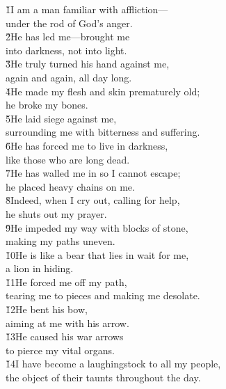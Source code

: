 \begin{poetry}
\poeml {}
\v{1}I am a man familiar with affliction--- \\
\poemll    under the rod of God's anger. \\
\poeml \v{2}He has led me---brought me \\
\poemll    into darkness, not into light. \\
\poeml \v{3}He truly turned his hand against me, \\
\poemll    again and again, all day long. \\
\poeml \v{4}He made my flesh and skin prematurely old; \\
\poemll    he broke my bones. \\
\poeml \v{5}He laid siege against me, \\
\poemll    surrounding me with bitterness and suffering. \\
\poeml \v{6}He has forced me to live in darkness, \\
\poemll    like those who are long dead. \\
\poeml \v{7}He has walled me in so I cannot escape; \\
\poemll    he placed heavy chains on me. \\
\poeml \v{8}Indeed, when I cry out, calling for help, \\
\poemll    he shuts out my prayer. \\
\poeml \v{9}He impeded my way with blocks of stone, \\
\poemll    making my paths uneven. \\
\poeml \v{10}He is like a bear that lies in wait for me, \\
\poemll    a lion in hiding. \\
\poeml \v{11}He forced me off my path, \\
\poemll    tearing me to pieces and making me desolate. \\
\poeml \v{12}He bent his bow, \\
\poemll    aiming at me with his arrow. \\
\poeml \v{13}He caused his war arrows \\
\poemll    to pierce my vital organs. \\
\poeml \v{14}I have become a laughingstock to all my people, \\
\poemll    the object of their taunts throughout the day. \\

\end{poetry}
